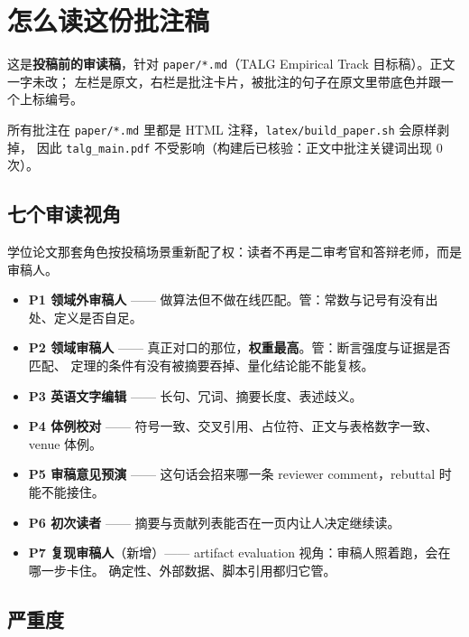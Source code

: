 \chapter*{怎么读这份批注稿}\label{ux600eux4e48ux8bfbux8fd9ux4efdux6279ux6ce8ux7a3f}

这是\textbf{投稿前的审读稿}，针对 \texttt{paper/*.md}（TALG Empirical
Track 目标稿）。正文一字未改；
左栏是原文，右栏是批注卡片，被批注的句子在原文里带底色并跟一个上标编号。

所有批注在 \texttt{paper/*.md} 里都是 HTML
注释，\texttt{latex/build\_paper.sh} 会原样剥掉， 因此
\texttt{talg\_main.pdf} 不受影响（构建后已核验：正文中批注关键词出现 0
次）。

\section*{七个审读视角}\label{ux4e03ux4e2aux5ba1ux8bfbux89c6ux89d2}

学位论文那套角色按投稿场景重新配了权：读者不再是二审考官和答辩老师，而是审稿人。

\begin{itemize}
\tightlist
\item
  \textbf{P1 领域外审稿人} ------
  做算法但不做在线匹配。管：常数与记号有没有出处、定义是否自足。
\item
  \textbf{P2 领域审稿人} ------
  真正对口的那位，\textbf{权重最高}。管：断言强度与证据是否匹配、
  定理的条件有没有被摘要吞掉、量化结论能不能复核。
\item
  \textbf{P3 英语文字编辑} ------ 长句、冗词、摘要长度、表述歧义。
\item
  \textbf{P4 体例校对} ------
  符号一致、交叉引用、占位符、正文与表格数字一致、venue 体例。
\item
  \textbf{P5 审稿意见预演} ------ 这句话会招来哪一条 reviewer
  comment，rebuttal 时能不能接住。
\item
  \textbf{P6 初次读者} ------ 摘要与贡献列表能否在一页内让人决定继续读。
\item
  \textbf{P7 复现审稿人}（新增）------ artifact evaluation
  视角：审稿人照着跑，会在哪一步卡住。
  确定性、外部数据、脚本引用都归它管。
\end{itemize}

\section*{严重度}\label{ux4e25ux91cdux5ea6}

